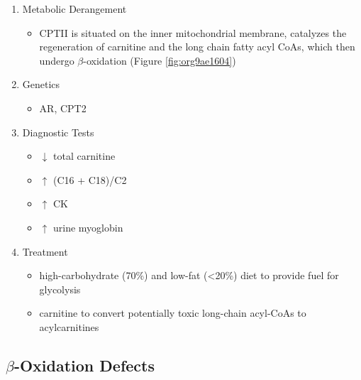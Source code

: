 \documentclass{scrartcl}
\begin{document}
\begin{enumerate}
\item Metabolic Derangement
\label{sec:org784f016}
\begin{itemize}
\item CPTII is situated on the inner mitochondrial membrane, catalyzes the
regeneration of carnitine and the long chain fatty acyl CoAs, which
then undergo \(\beta\)-oxidation (Figure \ref{fig:org9ae1604})
\end{itemize}
\item Genetics
\label{sec:orgf980253}
\begin{itemize}
\item AR, CPT2
\end{itemize}
\item Diagnostic Tests
\label{sec:orgc687958}
\begin{itemize}
\item \(\downarrow\) total carnitine
\item \(\uparrow\) (C16 + C18)/C2
\item \(\uparrow\) CK
\item \(\uparrow\) urine myoglobin
\end{itemize}
\item Treatment
\label{sec:org4bdfc9e}
\begin{itemize}
\item high-carbohydrate (70\%) and low-fat (<20\%) diet to provide fuel for glycolysis
\item carnitine to convert potentially toxic long-chain acyl-CoAs to
acylcarnitines
\end{itemize}
\end{enumerate}
\subsection{\(\beta\)-Oxidation Defects}
\label{sec:orga046b02}
\end{document}
